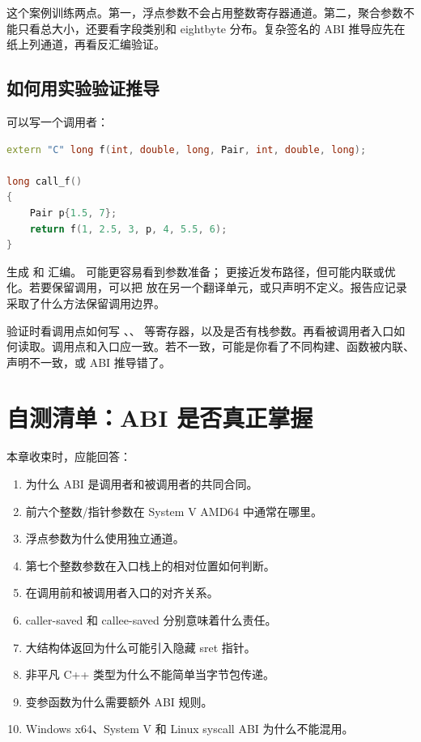 这个案例训练两点。第一，浮点参数不会占用整数寄存器通道。第二，聚合参数不能只看总大小，还要看字段类别和 eightbyte 分布。复杂签名的 ABI 推导应先在纸上列通道，再看反汇编验证。

\subsection{如何用实验验证推导}

可以写一个调用者：

\begin{lstlisting}[language=C++]
extern "C" long f(int, double, long, Pair, int, double, long);

long call_f()
{
    Pair p{1.5, 7};
    return f(1, 2.5, 3, p, 4, 5.5, 6);
}
\end{lstlisting}

生成  和  汇编。  可能更容易看到参数准备； 更接近发布路径，但可能内联或优化。若要保留调用，可以把  放在另一个翻译单元，或只声明不定义。报告应记录采取了什么方法保留调用边界。

验证时看调用点如何写 、、 等寄存器，以及是否有栈参数。再看被调用者入口如何读取。调用点和入口应一致。若不一致，可能是你看了不同构建、函数被内联、声明不一致，或 ABI 推导错了。

\section{自测清单：ABI 是否真正掌握}

本章收束时，应能回答：

\begin{enumerate}
  \item 为什么 ABI 是调用者和被调用者的共同合同。
  \item 前六个整数/指针参数在 System V AMD64 中通常在哪里。
  \item 浮点参数为什么使用独立通道。
  \item 第七个整数参数在入口栈上的相对位置如何判断。
  \item {} 在调用前和被调用者入口的对齐关系。
  \item caller-saved 和 callee-saved 分别意味着什么责任。
  \item 大结构体返回为什么可能引入隐藏 sret 指针。
  \item 非平凡 C++ 类型为什么不能简单当字节包传递。
  \item 变参函数为什么需要额外 ABI 规则。
  \item Windows x64、System V 和 Linux syscall ABI 为什么不能混用。
\end{enumerate}

